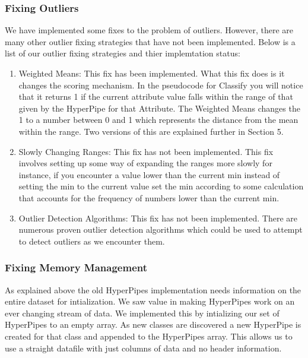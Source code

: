 \subsubsection{Fixing Outliers}
We have implemented some fixes to the problem of outliers. 
However, there are many other outlier fixing strategies that have 
not been implemented. Below is a list of our outlier fixing 
strategies and thier implemtation status:
\begin{enumerate}
\item Weighted Means: This fix has been implemented. What this fix 
does is it changes the scoring mechanism. In the pseudocode for 
Classify you will notice that it returns 1 if the current attribute 
value falls within the range of that given by the HyperPipe for that 
Attribute. The Weighted Means changes the 1 to a number between 0 
and 1 which represents the distance from the mean within the range. 
Two versions of this are explained further in Section 5.
\item Slowly Changing Ranges: This fix has not been implemented. 
This fix involves setting up some way of expanding the ranges more 
slowly for instance, if you encounter a value lower than the current 
min instead of setting the min to the current value set the min 
according to some calculation that accounts for the frequency of 
numbers lower than the current min.
\item Outlier Detection Algorithms: This fix has not been implemented. 
There are numerous proven outlier detection algorithms which could be 
used to attempt to detect outliers as we encounter them.
\end{enumerate}


\subsubsection{Fixing Memory Management}
As explained above the old HyperPipes implementation needs information 
on the entire dataset for intialization. We saw value in making 
HyperPipes work on an ever changing stream of data. We implemented this 
by intializing our set of HyperPipes to an empty array. As new classes 
are discovered a new HyperPipe is created for that class and appended 
to the HyperPipes array. This allows us to use a straight datafile with 
just columns of data and no header information. 
